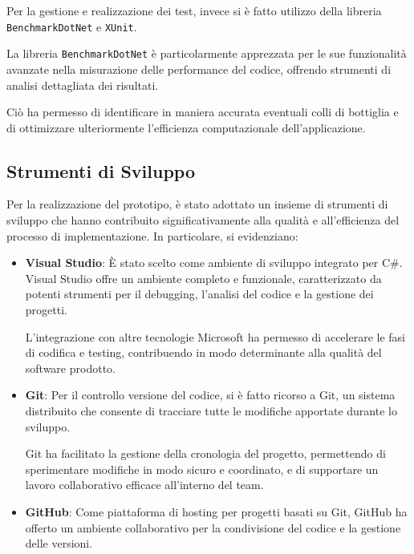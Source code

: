\documentclass[12pt,a4paper,openright,twoside]{book}
\begin{document}
            Per la gestione e realizzazione dei test, invece si è fatto utilizzo della libreria \texttt{BenchmarkDotNet} e \texttt{XUnit}.

            La libreria \texttt{BenchmarkDotNet} è particolarmente apprezzata per le sue funzionalità avanzate nella misurazione delle performance del codice, offrendo strumenti di analisi dettagliata dei risultati.

            Ciò ha permesso di identificare in maniera accurata eventuali colli di bottiglia e di ottimizzare ulteriormente l’efficienza computazionale dell’applicazione.

        \subsection{Strumenti di Sviluppo}

            Per la realizzazione del prototipo, è stato adottato un insieme di strumenti di sviluppo che hanno contribuito significativamente alla qualità e all’efficienza del processo di implementazione. In particolare, si evidenziano:

            \begin{itemize}
                \item \textbf{Visual Studio}: È stato scelto come ambiente di sviluppo integrato per C\#. Visual Studio offre un ambiente completo e funzionale, caratterizzato da potenti strumenti per il debugging, l’analisi del codice e la gestione dei progetti.

                L’integrazione con altre tecnologie Microsoft ha permesso di accelerare le fasi di codifica e testing, contribuendo in modo determinante alla qualità del software prodotto.

                \item \textbf{Git}: Per il controllo versione del codice, si è fatto ricorso a Git, un sistema distribuito che consente di tracciare tutte le modifiche apportate durante lo sviluppo.

                Git ha facilitato la gestione della cronologia del progetto, permettendo di sperimentare modifiche in modo sicuro e coordinato, e di supportare un lavoro collaborativo efficace all'interno del team.

                \item \textbf{GitHub}: Come piattaforma di hosting per progetti basati su Git, GitHub ha offerto un ambiente collaborativo per la condivisione del codice e la gestione delle versioni.
            \end{itemize}
\end{document}
